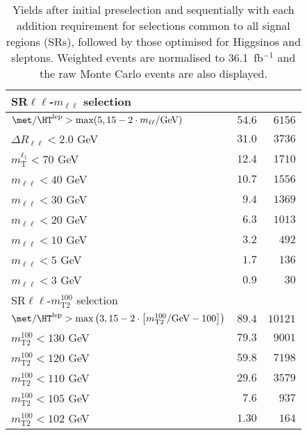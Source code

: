 \begin{table}
\begin{center}
\begin{tabular*}{\textwidth}{@{\extracolsep{\fill}}lrr}
\midrule
SR$\ell\ell$-$m_{\ell\ell}$ selection & \\ 
\midrule
$\met / \HT^\text{lep} > \text{max}(5, 15-2\cdot m_{\ell\ell}/\text{GeV})$ & $54.6$ & $6156$   \\ 
    $\Delta R_{\ell\ell} < 2.0$ GeV & $31.0$ & $3736$   \\ 
    $m_\text{T}^{\ell_1} < 70$ GeV & $12.4$ & $1710$   \\ 
    $m_{\ell\ell} < 40$ GeV & $10.7$ & $1556$   \\ 
    $m_{\ell\ell} < 30$ GeV & $9.4$ & $1369$   \\ 
    $m_{\ell\ell} < 20$ GeV & $6.3$ & $1013$   \\ 
    $m_{\ell\ell} < 10$ GeV & $3.2$ & $492$   \\ 
    $m_{\ell\ell} < 5$ GeV & $1.7$ & $136$   \\ 
    $m_{\ell\ell} < 3$ GeV & $0.9$ & $30$   \\ 
    \midrule
SR$\ell\ell$-$m_\text{T2}^{100}$ selection & \\ 
\midrule
$\met / \HT^\text{lep} > \text{max}\left(3, 15-2\cdot \left[m_\text{T2}^{100}/\text{GeV} - 100\right]\right)$ & $89.4$ & $10121$   \\ 
    $m_\text{T2}^{100} < 130$ GeV & $79.3$ & $9001$   \\ 
    $m_\text{T2}^{100} < 120$ GeV & $59.8$ & $7198$   \\ 
    $m_\text{T2}^{100} < 110$ GeV & $29.6$ & $3579$   \\ 
    $m_\text{T2}^{100} < 105$ GeV & $7.6$ & $937$   \\ 
    $m_\text{T2}^{100} < 102$ GeV & $1.30$ & $164$   \\ 
    
  \bottomrule
  \end{tabular*}
\end{center}
\caption{ Yields after initial preselection and sequentially with each addition requirement 
for selections common to all signal regions (SRs), 
followed by those optimised for Higgsinos and sleptons. 
Weighted events are normalised to 36.1~fb$^{-1}$ and the raw Monte Carlo events are also displayed.
}
\label{tab:cutflow_diboson}
\end{table} 
  